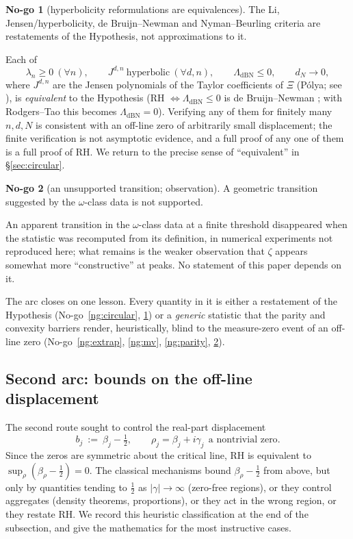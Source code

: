 \documentclass[11pt]{amsart}
\theoremstyle{definition}
\theoremstyle{remark}
\theoremstyle{definition}
\newtheorem{nogo}{No-go}[section]
\begin{document}
\begin{nogo}[hyperbolicity reformulations are equivalences]\label{ng:reform}
The Li, Jensen/hyperbolicity, de Bruijn--Newman and Nyman--Beurling criteria are restatements of the
Hypothesis, not approximations to it.
\end{nogo}
\noindent Each of
\[
   \lambda_n\ge0\ (\forall n),\qquad J^{d,n}\ \text{hyperbolic}\ (\forall d,n),\qquad
   \Lambda_{\mathrm{dBN}}\le0,\qquad d_N\to0,
\]
where $J^{d,n}$ are the Jensen polynomials of the Taylor coefficients of $\Xi$ (P\'olya; see
\cite{GORZ}), is \emph{equivalent} to the Hypothesis \cite{Li,GORZ,BaezDuarte,deBruijn,Newman,RodgersTao}
(RH $\iff\Lambda_{\mathrm{dBN}}\le0$ is de Bruijn--Newman \cite{deBruijn,Newman}; with Rodgers--Tao \cite{RodgersTao} this becomes $\Lambda_{\mathrm{dBN}}=0$). Verifying any of them for
finitely many $n,d,N$ is consistent with an off-line zero of arbitrarily small displacement; the finite
verification is not asymptotic evidence, and a full proof of any one of them is a full proof of RH. We
return to the precise sense of ``equivalent'' in \S\ref{sec:circular}.

\begin{nogo}[an unsupported transition; observation]\label{ng:phantom}
A geometric transition suggested by the $\omega$-class data is not supported.
\end{nogo}
\noindent An apparent transition in the $\omega$-class data at a finite threshold disappeared when the
statistic was recomputed from its definition, in numerical experiments not reproduced here; what remains is
the weaker observation that $\zeta$ appears somewhat more ``constructive'' at peaks. No statement of this
paper depends on it.

The arc closes on one lesson. Every quantity in it is either a restatement of the Hypothesis
(No-go~\ref{ng:circular}, \ref{ng:reform}) or a \emph{generic} statistic that the parity and convexity
barriers render, heuristically, blind to the measure-zero event of an off-line zero (No-go~\ref{ng:extrap}, \ref{ng:mv},
\ref{ng:parity}, \ref{ng:phantom}).

\subsection{Second arc: bounds on the off-line displacement}\label{sec:arcB}

The second route sought to control the real-part displacement
\[
   b_j\ :=\ \beta_j-\tfrac12,\qquad \rho_j=\beta_j+i\gamma_j\ \ \text{a nontrivial zero}.
\]
Since the zeros are symmetric about the critical line, RH is equivalent to $\sup_\rho(\beta_\rho-\tfrac12)=0$.
The classical mechanisms bound $\beta_\rho-\tfrac12$ from above, but only by quantities tending to
$\tfrac12$ as $|\gamma|\to\infty$ (zero-free regions), or they control aggregates (density theorems,
proportions), or they act in the wrong region, or they restate RH. We record this heuristic classification at
the end of the subsection, and give the mathematics for the most instructive cases.
\end{document}
